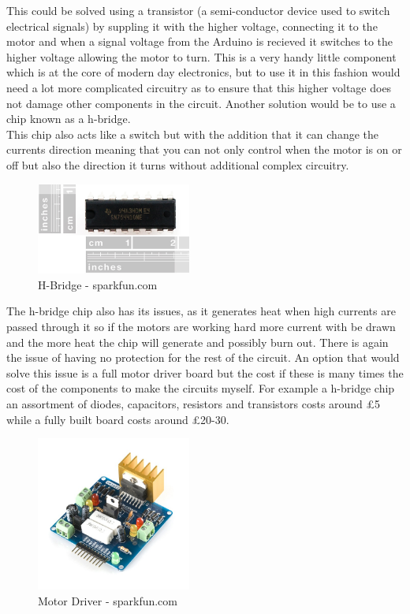 This could be solved using a transistor (a semi-conductor device used to switch electrical signals) by suppling it with the higher voltage, connecting it to the motor and when a signal voltage from the Arduino is recieved it switches to the higher voltage allowing the motor to turn.  This is a very handy little component which is at the core of modern day electronics, but to use it in this fashion would need a lot more complicated circuitry as to ensure that this higher voltage does not damage other components in the circuit.  Another solution would be to use a chip known as a h-bridge.
\\This chip also acts like a switch but with the addition that it can change the currents direction meaning that you can not only control when the motor is on or off but also the direction it turns without additional complex circuitry.
\begin{figure}[h]
\centering
	\includegraphics[width=2.0in]  {Images/h-bridge.jpg}
	\caption{H-Bridge - sparkfun.com}
	\label{H-Bridge}
\end{figure}
The h-bridge chip also has its issues, as it generates heat when high currents are passed through it so if the motors are working hard more current with be drawn and the more heat the chip will generate and possibly burn out.  There is again the issue of having no protection for the rest of the circuit.  An option that would solve this issue is a full motor driver board but the cost if these is many times the cost of the components to make the circuits myself.  For example a h-bridge chip an assortment of diodes, capacitors, resistors and transistors costs around \pounds5 while a fully built board costs around \pounds20-30.
\begin{figure}[h]
\centering
        \includegraphics[width=2.0in]  {Images/motor-driver.jpg}
        \caption{Motor Driver - sparkfun.com}
        \label{Motor Driver}
\end{figure}
